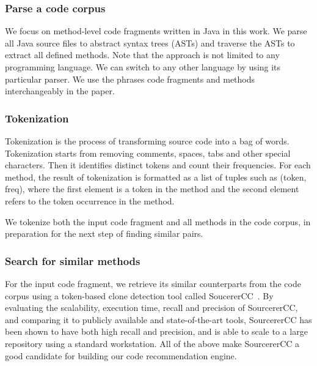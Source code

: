 \subsubsection{Parse a code corpus}
We focus on method-level code fragments written in Java in this work. We parse all Java source files to abstract syntax trees (ASTs) and traverse the ASTs to extract all defined methods. Note that the approach is not limited to any programming language. We can switch to any other language by using its particular parser. We use the phrases code fragments and methods interchangeably in the paper.

\subsubsection{Tokenization}
Tokenization is the process of transforming source code into a bag of words. Tokenization starts from removing comments, spaces, tabs and other special characters. Then it identifies distinct tokens and count their frequencies. For each method, the result of tokenization is formatted as a list of tuples such as {\ttt (token, freq)}, where the first element is a token in the method and the second element refers to the token occurrence in the method.

We tokenize both the input code fragment and all methods in the code corpus, in preparation for the next step of finding similar pairs.

\subsubsection{Search for similar methods}
For the input code fragment, we retrieve its similar counterparts from the code corpus using a token-based clone detection tool called SoucererCC~\cite{sajnani2016sourcerercc}. By evaluating the scalability, execution time, recall and precision of SourcererCC, and comparing it to publicly available and state-of-the-art tools, SourcererCC has been shown to have both high recall and precision, and is able to scale to a large repository using a standard workstation. All of the above make SourcererCC a good candidate for building our code recommendation engine. 

